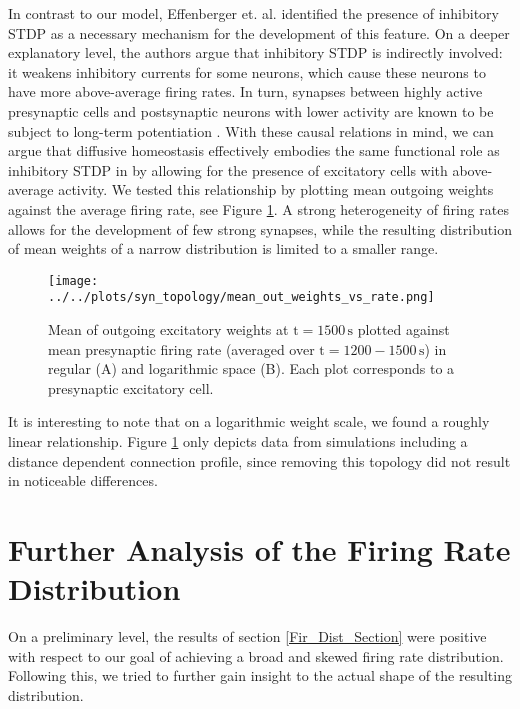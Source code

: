 \documentclass[10pt,a4paper]{article}
\begin{document}
In contrast to our model, Effenberger et. al. identified the presence of inhibitory STDP as a necessary mechanism for the development of this feature. On a deeper explanatory level, the authors argue that inhibitory STDP is indirectly involved: it weakens inhibitory currents for some neurons, which cause these neurons to have more above-average firing rates. In turn, synapses between highly active presynaptic cells and postsynaptic neurons with lower activity are known to be subject to long-term potentiation \cite{Sjoestroem_Syn_Plasticity_2001,Feldman_STDP_2012}. With these causal relations in mind, we can argue that diffusive homeostasis effectively embodies the same functional role as inhibitory STDP in \cite{Effenberger_2015} by allowing for the presence of excitatory cells with above-average activity. We tested this relationship by plotting mean outgoing weights against the average firing rate, see Figure \ref{Out_Weight_vs_F}. A strong heterogeneity of firing rates allows for the development of few strong synapses, while the resulting distribution of mean weights of a narrow distribution is limited to a smaller range.
\begin{figure}
\texttt{[image: ../../plots/syn\_topology/mean\_out\_weights\_vs\_rate.png]}
\caption{Mean of outgoing excitatory weights at $\mathrm{t=1500\,s}$ plotted against mean presynaptic firing rate (averaged over $\mathrm{t=1200-1500\,s}$) in regular (A) and logarithmic space (B). Each plot corresponds to a presynaptic excitatory cell.}
\label{Out_Weight_vs_F}
\end{figure}
It is interesting to note that on a logarithmic weight scale, we found a roughly linear relationship. Figure \ref{Out_Weight_vs_F} only depicts data from simulations including a distance dependent connection profile, since removing this topology did not result in noticeable differences.

\section{Further Analysis of the Firing Rate Distribution}
On a preliminary level, the results of section \ref{Fir_Dist_Section} were positive with respect to our goal of achieving a broad and skewed firing rate distribution. Following this, we tried to further gain insight to the actual shape of the resulting distribution. 
\end{document}
